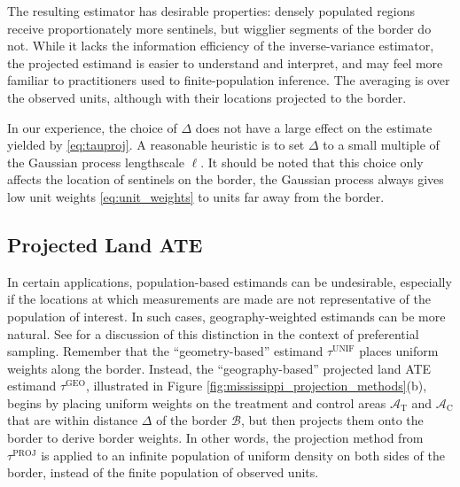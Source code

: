 \documentclass[letter,12pt]{article}
\newcommand{\area}{\mathcal{A}}
\newcommand{\treat}{\mathrm{T}}
\newcommand{\ctrol}{\mathrm{C}}
\newcommand{\border}{\mathcal{B}}
\newcommand{\unifavg}{\tau^{\mathrm{UNIF}}}
\newcommand{\tauproj}{\tau^{\mathrm{PROJ}}}
\newcommand{\taugeo}{\tau^{\mathrm{GEO}}}
\newcommand{\buffer}{\Delta}
\begin{document}
The resulting estimator has desirable properties: densely populated regions receive proportionately more sentinels, but wigglier segments of the border do not.
While it lacks the information efficiency of the inverse-variance estimator,
the projected estimand is easier to understand and interpret,
and may feel more familiar to practitioners used to finite-population inference.
The averaging is over the observed units, although with their locations projected to the border.

In our experience, the choice of \(\buffer\) does not have a large effect on the estimate yielded by \eqref{eq:tauproj}.
A reasonable heuristic is to set \(\buffer\) to a small multiple of the Gaussian process lengthscale \(\ell\).
It should be noted that this choice only affects the location of sentinels on the border, the Gaussian process always gives low unit weights \eqref{eq:unit_weights} to units far away from the border.



\hypertarget{projected-land-ate}{%
\subsection{Projected Land ATE}\label{projected-land-ate}}

In certain applications, population-based estimands can be undesirable, especially if the locations at which measurements are made are not representative of the population of interest.
In such cases, geography-weighted estimands can be more natural.
See \cite{antonelli2016positive} for a discussion of this distinction in the context of preferential sampling.
Remember that the ``geometry-based'' estimand \(\unifavg\) places uniform weights along the border.
Instead, the ``geography-based'' projected land ATE estimand \(\taugeo\), illustrated in Figure \ref{fig:mississippi_projection_methods}(b), begins by placing uniform weights on the treatment and control areas \(\area_\treat\) and \(\area_\ctrol\) that are within distance \(\buffer\) of the border \(\border\), but then projects them onto the border to derive border weights.
In other words, the projection method from \(\tauproj\) is applied to an infinite population of uniform density on both sides of the border, instead of the finite population of observed units.
\end{document}
